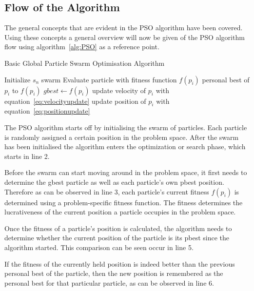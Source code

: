 \subsection{Flow of the Algorithm}
The general concepts that are evident in the PSO algorithm have been covered. Using these concepts a general overview will now be given of the PSO algorithm flow using algorithm~\ref{alg:PSO} as a reference point.
\begin{algorithm}[H]
\caption{Basic Global Particle Swarm Optimisation Algorithm\cite{CompuIntelligenceIntro}}
\label{alg:PSO}
	\begin{algorithmic}[1]
		\State Initialize $s_n$ swarm
				\State Evaluate particle with fitness function $f(p_i)$
					\State personal best of $p_i$ to $f(p_i)$
				\EndIf
					\State $gbest \leftarrow f(p_i)$
				\EndIf
			\EndFor
				\State update velocity of $p_i$ with equation~\ref{eq:velocityupdate}
				\State update position of $p_i$ with equation~\ref{eq:positionupdate}
			\EndFor
		\EndWhile
	\end{algorithmic}
\end{algorithm}

The PSO algorithm starts off by initialising the swarm of particles. Each particle is randomly assigned a certain position in the problem space. After the swarm has been initialised the algorithm enters the optimization or search phase, which starts in line 2.

Before the swarm can start moving around in the problem space, it first needs to determine the gbest particle as well as each particle's own pbest position. Therefore as can be observed in line 3, each particle's current fitness $f(p_i)$ is determined using a problem-specific fitness function. The fitness determines the lucrativeness of the current position a particle occupies in the problem space.

Once the fitness of a particle's position is calculated, the algorithm needs to determine whether the current position of the particle is its pbest since the algorithm started. This comparison can be seen occur in line 5. 

If the fitness of the currently held position is indeed better than the previous personal best of the particle, then the new position is remembered as the personal best for that particular particle, as can be observed in line 6.

